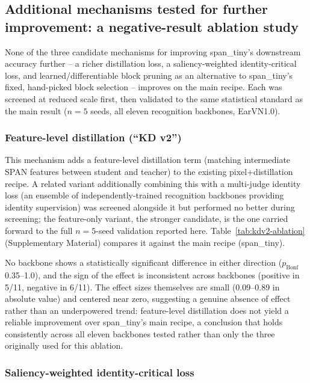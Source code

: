 \documentclass[11pt]{article}
\begin{document}
\subsection{Additional mechanisms tested for further improvement: a negative-result ablation study}
\label{sec:novelty-ablations}

None of the three candidate mechanisms for improving span\_tiny's downstream accuracy further -- a richer distillation loss, a saliency-weighted identity-critical loss, and learned/differentiable block pruning as an alternative to span\_tiny's fixed, hand-picked block selection -- improves on the main recipe. Each was screened at reduced scale first, then validated to the same statistical standard as the main result ($n=5$ seeds, all eleven recognition backbones, EarVN1.0).

\subsubsection{Feature-level distillation (``KD v2'')}

This mechanism adds a feature-level distillation term (matching intermediate SPAN features between student and teacher) to the existing pixel+distillation recipe. A related variant additionally combining this with a multi-judge identity loss (an ensemble of independently-trained recognition backbones providing identity supervision) was screened alongside it but performed no better during screening; the feature-only variant, the stronger candidate, is the one carried forward to the full $n=5$-seed validation reported here. Table~\ref{tab:kdv2-ablation} (Supplementary Material) compares it against the main recipe (span\_tiny).

No backbone shows a statistically significant difference in either direction ($p_{\text{Bonf}}$ 0.35--1.0), and the sign of the effect is inconsistent across backbones (positive in 5/11, negative in 6/11). The effect sizes themselves are small (0.09--0.89 in absolute value) and centered near zero, suggesting a genuine absence of effect rather than an underpowered trend: feature-level distillation does not yield a reliable improvement over span\_tiny's main recipe, a conclusion that holds consistently across all eleven backbones tested rather than only the three originally used for this ablation.

\subsubsection{Saliency-weighted identity-critical loss}
\end{document}
